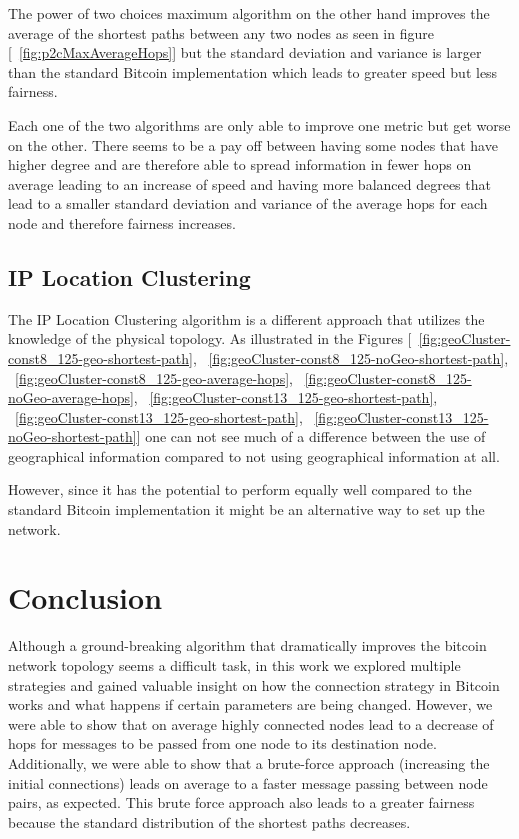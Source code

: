 \documentclass[a4paper, oneside]{discothesis}
\begin{document}
The power of two choices maximum algorithm on the other hand improves the average of the shortest paths between any two nodes as seen in figure [~\ref{fig:p2cMaxAverageHops}] but the standard deviation and variance is larger than the standard Bitcoin implementation which leads to greater speed but less fairness.

Each one of the two algorithms are only able to improve one metric but get worse on the other.
There seems to be a pay off between having some nodes that have higher degree and are therefore able to spread information in fewer hops on average leading to an increase of speed and having more balanced degrees that lead to a smaller standard deviation and variance of the average hops for each node and therefore fairness increases.

\section{IP Location Clustering}

The IP Location Clustering algorithm is a different approach that utilizes the knowledge of the physical topology. As illustrated in the Figures [~\ref{fig:geoCluster-const8_125-geo-shortest-path}, ~\ref{fig:geoCluster-const8_125-noGeo-shortest-path}, ~\ref{fig:geoCluster-const8_125-geo-average-hops}, ~\ref{fig:geoCluster-const8_125-noGeo-average-hops}, ~\ref{fig:geoCluster-const13_125-geo-shortest-path}, ~\ref{fig:geoCluster-const13_125-geo-shortest-path}, ~\ref{fig:geoCluster-const13_125-noGeo-shortest-path}] one can not see much of a difference between the use of geographical information compared to not using geographical information at all.

However, since it has the potential to perform equally well compared to the standard Bitcoin implementation it might be an alternative way to set up the network.

\chapter{Conclusion}

Although a ground-breaking algorithm that dramatically improves the bitcoin network topology seems a difficult task, in this work we explored multiple strategies and gained valuable insight on how the connection strategy in Bitcoin works and what happens if certain parameters are being changed.
However, we were able to show that on average highly connected nodes lead to a decrease of hops for messages to be passed from one node to its destination node. Additionally, we were able to show that a brute-force approach (increasing the initial connections) leads on average to a faster message passing between node pairs, as expected. This brute force approach also leads to a greater fairness because the standard distribution of the shortest paths decreases. 
\end{document}

